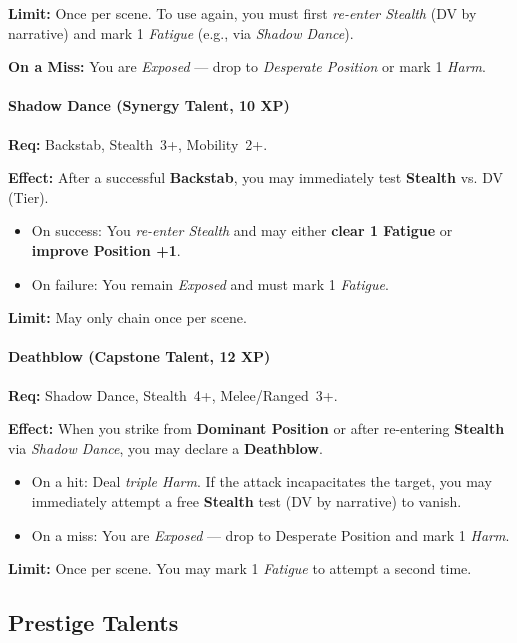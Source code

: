 \textbf{Limit:} Once per scene. To use again, you must first \emph{re-enter Stealth} (DV by narrative) and mark 1 \emph{Fatigue} (e.g., via \emph{Shadow Dance}).  

\textbf{On a Miss:} You are \emph{Exposed} --- drop to \emph{Desperate Position} or mark 1 \emph{Harm}.    

\paragraph{Shadow Dance (Synergy Talent, 10 XP)}  
\textbf{Req:} Backstab, Stealth~3+, Mobility~2+.  

\textbf{Effect:} After a successful \textbf{Backstab}, you may immediately test \textbf{Stealth} vs. DV (Tier).  
\begin{itemize}
  \item On success: You \emph{re-enter Stealth} and may either \textbf{clear 1 Fatigue} or \textbf{improve Position +1}.  
  \item On failure: You remain \emph{Exposed} and must mark 1 \emph{Fatigue}.  
\end{itemize}  

\textbf{Limit:} May only chain once per scene.   

\paragraph{Deathblow (Capstone Talent, 12 XP)}  
\textbf{Req:} Shadow Dance, Stealth~4+, Melee/Ranged~3+.  

\textbf{Effect:} When you strike from \textbf{Dominant Position} or after re-entering \textbf{Stealth} via \emph{Shadow Dance}, you may declare a \textbf{Deathblow}.  
\begin{itemize}
  \item On a hit: Deal \emph{triple Harm}. If the attack incapacitates the target, you may immediately attempt a free \textbf{Stealth} test (DV by narrative) to vanish.  
  \item On a miss: You are \emph{Exposed} — drop to Desperate Position and mark 1 \emph{Harm}.  
\end{itemize}  

\textbf{Limit:} Once per scene. You may mark 1 \emph{Fatigue} to attempt a second time.  

\subsection{Prestige Talents}

